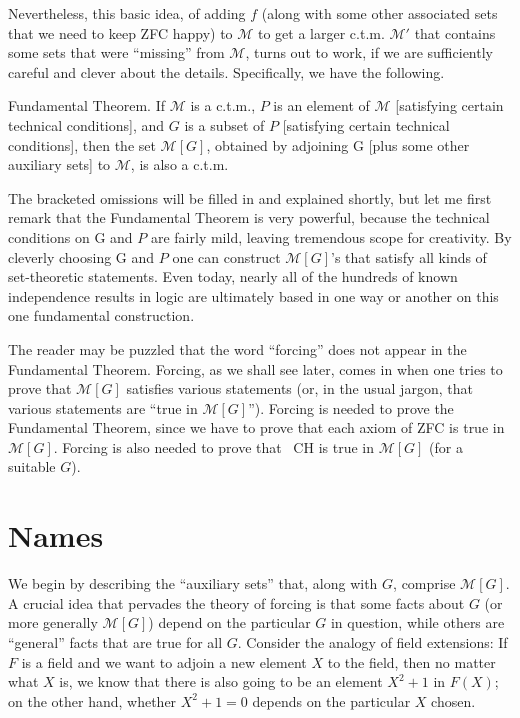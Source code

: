 \documentclass[10pt]{article}
\newcommand\axiom[1]{\textmd{#1}}
\theoremstyle{definition}
\begin{document}
Nevertheless, this basic idea, of adding $f$ (along with some other associated sets that we need to keep \axiom{ZFC} happy) to $\mathcal M$ to get a larger c.t.m. $\mathcal{M'}$ that contains some sets that were ``missing'' from $\mathcal M$, turns out to work, if we are sufficiently careful and clever about the details. Specifically, we have the following.

Fundamental Theorem. If $\mathcal M$ is a c.t.m., $P$ is an element of $\mathcal M$ [satisfying certain technical conditions], and $G$ is a subset of $P$ [satisfying certain technical conditions], then the set $\mathcal M[G]$, obtained by adjoining G [plus some other auxiliary sets] to $\mathcal M$, is also a c.t.m.

The bracketed omissions will be filled in and explained shortly, but let me first remark that the Fundamental Theorem is very powerful, because the technical conditions on G and $P$ are fairly mild, leaving tremendous scope for creativity. By cleverly choosing G and $P$ one can construct $\mathcal M[G]$'s that satisfy all kinds of set-theoretic statements. Even today, nearly all of the hundreds of known independence results in logic are ultimately based in one way or another on this one fundamental construction.

The reader may be puzzled that the word ``forcing'' does not appear in the Fundamental Theorem. Forcing, as we shall see later, comes in when one tries to prove that $\mathcal M[G]$ satisfies various statements (or, in the usual jargon, that various statements are ``true in $\mathcal M[G]$''). Forcing is needed to prove the Fundamental Theorem, since we have to prove that each axiom of \axiom{ZFC} is true in $\mathcal M[G]$. Forcing is also needed to prove that \axiom{~CH} is true in $\mathcal M[G]$ (for a suitable $G$).


\section{Names}

We begin by describing the ``auxiliary sets'' that, along with $G$, comprise $\mathcal M[G]$. A crucial idea that pervades the theory of forcing is that some facts about $G$ (or more generally $\mathcal M[G]$) depend on the particular $G$ in question, while others are ``general'' facts that are true for all $G$. Consider the analogy of field extensions: If $F$ is a field and we want to adjoin a new element $X$ to the field, then no matter what $X$ is, we know that there is also going to be an element $X^2 + 1$ in $F(X)$; on the other hand, whether $X^2 + 1 = 0$ depends on the particular $X$ chosen.
\end{document}
